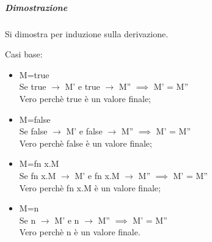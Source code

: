\subparagraph{Dimostrazione}
Si dimostra per induzione sulla derivazione.

Casi base:
\begin{itemize}
	\item M=true \\
	\indent	Se true $\rightarrow$ M' e true $\rightarrow$ M'' $\implies$ M' = M''\\
	\indent Vero perchè true è un valore finale;
	
 \item M=false \\
	\indent	Se false $\rightarrow$ M' e false $\rightarrow$ M'' $\implies$ M' = M''\\
	\indent Vero perchè false è un valore finale;

\item M=fn x.M \\
	\indent	Se fn x.M $\rightarrow$ M' e fn x.M $\rightarrow$ M'' $\implies$ M' = M''\\
	\indent Vero perchè fn x.M è un valore finale;
	\item M=n \\
	\indent	Se n $\rightarrow$ M' e n $\rightarrow$ M'' $\implies$ M' = M''\\
	\indent Vero perchè n è un valore finale.
\end{itemize}
 

